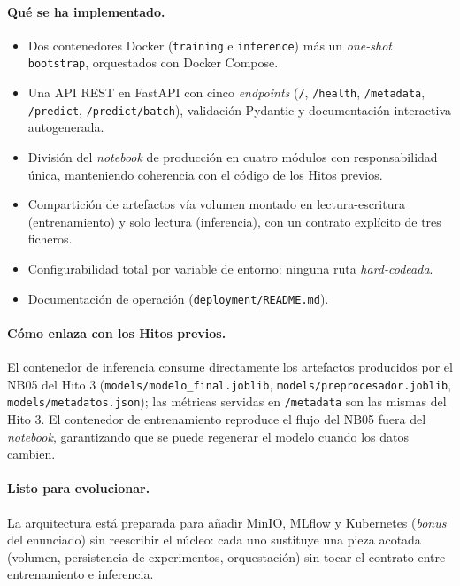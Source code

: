 \documentclass[12pt,a4paper]{report}
\begin{document}
\paragraph{Qué se ha implementado.}
\begin{itemize}
    \item Dos contenedores Docker (\texttt{training} e \texttt{inference}) más un \textit{one-shot} \texttt{bootstrap}, orquestados con Docker Compose.
    \item Una API REST en FastAPI con cinco \textit{endpoints} (\texttt{/}, \texttt{/health}, \texttt{/metadata}, \texttt{/predict}, \texttt{/predict/batch}), validación Pydantic y documentación interactiva autogenerada.
    \item División del \textit{notebook} de producción en cuatro módulos con responsabilidad única, manteniendo coherencia con el código de los Hitos previos.
    \item Compartición de artefactos vía volumen montado en lectura-escritura (entrenamiento) y solo lectura (inferencia), con un contrato explícito de tres ficheros.
    \item Configurabilidad total por variable de entorno: ninguna ruta \textit{hard-codeada}.
    \item Documentación de operación (\texttt{deployment/README.md}).
\end{itemize}

\paragraph{Cómo enlaza con los Hitos previos.} El contenedor de inferencia consume directamente los artefactos producidos por el NB05 del Hito 3 (\texttt{models/modelo\_final.joblib}, \texttt{models/preprocesador.joblib}, \texttt{models/metadatos.json}); las métricas servidas en \texttt{/metadata} son las mismas del Hito 3. El contenedor de entrenamiento reproduce el flujo del NB05 fuera del \textit{notebook}, garantizando que se puede regenerar el modelo cuando los datos cambien.

\paragraph{Listo para evolucionar.} La arquitectura está preparada para añadir MinIO, MLflow y Kubernetes (\textit{bonus} del enunciado) sin reescribir el núcleo: cada uno sustituye una pieza acotada (volumen, persistencia de experimentos, orquestación) sin tocar el contrato entre entrenamiento e inferencia.
\end{document}
